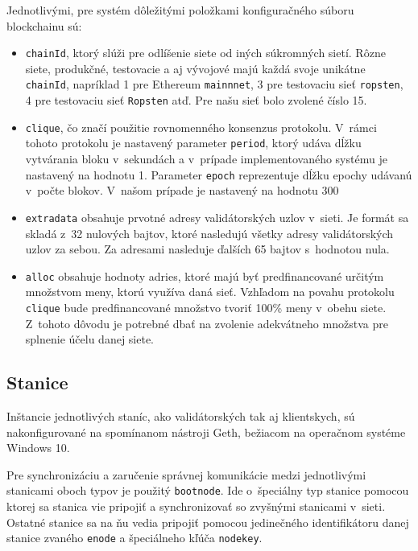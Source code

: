Jednotlivými, pre systém dôležitými položkami konfiguračného súboru blockchainu sú:

\begin{itemize}
  \item{\texttt{chainId}, ktorý slúži pre odlíšenie siete od iných súkromných sietí. Rôzne siete, produkčné, testovacie a aj vývojové majú každá svoje unikátne \texttt{chainId}, napríklad 1 pre Ethereum \texttt{mainnnet}, 3 pre testovaciu sieť \texttt{ropsten}, 4 pre testovaciu sieť \texttt{Ropsten} atď. Pre našu sieť bolo zvolené číslo 15.}
  \item{\texttt{clique}, čo značí použitie rovnomenného konsenzus protokolu. V~rámci tohoto protokolu je nastavený parameter \texttt{period}, ktorý udáva dĺžku vytvárania bloku v~sekundách a v~prípade implementovaného systému je nastavený na hodnotu 1. Parameter \texttt{epoch} reprezentuje dĺžku epochy udávanú v~počte blokov. V~našom prípade je nastavený na hodnotu 300}
  \item{\texttt{extradata} obsahuje prvotné adresy validátorských uzlov v~sieti. Je formát sa skladá z~32 nulových bajtov, ktoré nasledujú všetky adresy validátorských uzlov za sebou. Za adresami nasleduje ďalších 65 bajtov s~hodnotou nula.}
  \item{\texttt{alloc} obsahuje hodnoty adries, ktoré majú byť predfinancované určitým množstvom meny, ktorú využíva daná sieť. Vzhľadom na povahu protokolu \texttt{clique} bude predfinancované množstvo tvoriť 100\% meny v~obehu siete. Z~tohoto dôvodu je potrebné dbať na zvolenie adekvátneho množstva pre splnenie účelu danej siete.}
\end{itemize}

\subsection{Stanice}
Inštancie jednotlivých staníc, ako validátorských tak aj klientskych, sú nakonfigurované na spomínanom nástroji Geth, bežiacom na operačnom systéme Windows 10.

Pre synchronizáciu a zaručenie správnej komunikácie medzi jednotlivými stanicami oboch typov je použitý \texttt{bootnode}. Ide o~špeciálny typ stanice pomocou ktorej sa stanica vie pripojiť a synchronizovať so zvyšnými stanicami v~sieti. Ostatné stanice sa na ňu vedia pripojiť pomocou jedinečného identifikátoru danej stanice zvaného \texttt{enode} a špeciálneho kľúča \texttt{nodekey}. 

